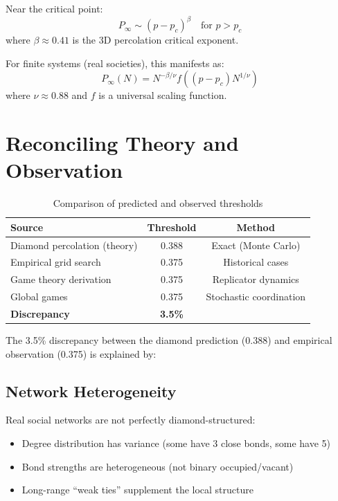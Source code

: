 \documentclass[11pt]{article}
\begin{document}
Near the critical point:
\begin{equation}
P_\infty \sim (p - p_c)^\beta \quad \text{for } p > p_c
\end{equation}
where $\beta \approx 0.41$ is the 3D percolation critical exponent.

For finite systems (real societies), this manifests as:
\begin{equation}
P_\infty(N) = N^{-\beta/\nu} f\left((p - p_c) N^{1/\nu}\right)
\end{equation}
where $\nu \approx 0.88$ and $f$ is a universal scaling function.

\section{Reconciling Theory and Observation}

\begin{table}[h]
\centering
\caption{Comparison of predicted and observed thresholds}
\begin{tabular}{lcc}
\toprule
\textbf{Source} & \textbf{Threshold} & \textbf{Method} \\
\midrule
Diamond percolation (theory) & 0.388 & Exact (Monte Carlo) \\
Empirical grid search & 0.375 & Historical cases \\
Game theory derivation & 0.375 & Replicator dynamics \\
Global games & 0.375 & Stochastic coordination \\
\midrule
\textbf{Discrepancy} & \textbf{3.5\%} & \\
\bottomrule
\end{tabular}
\end{table}

The 3.5\% discrepancy between the diamond prediction (0.388) and empirical observation (0.375) is explained by:

\subsection{Network Heterogeneity}

Real social networks are not perfectly diamond-structured:
\begin{itemize}
\item Degree distribution has variance (some have 3 close bonds, some have 5)
\item Bond strengths are heterogeneous (not binary occupied/vacant)
\item Long-range ``weak ties'' supplement the local structure
\end{itemize}
\end{document}
